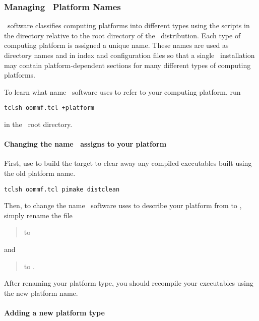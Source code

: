 \subsubsection{Managing \OOMMF\ Platform Names}\label{sec:platformNames}

\OOMMF\ software classifies computing platforms into different types
using the scripts in the directory  relative to the
root directory of the \OOMMF\ distribution.  
Each type of computing platform is assigned a unique name.  
These names are used as directory names
and in index and configuration files so that a single 
\OOMMF\ installation may contain platform-dependent sections for many
different types of computing platforms.

To learn what name \OOMMF\ software uses to refer to your computing
platform, run 
\begin{verbatim}
tclsh oommf.tcl +platform
\end{verbatim}
in the \OOMMF\ root directory.

\paragraph{Changing the name \OOMMF\ assigns to your platform}

First, use 
to build the target  to
clear away any compiled executables built using the old platform
name.
\begin{verbatim}
tclsh oommf.tcl pimake distclean
\end{verbatim}
Then, to change the name \OOMMF\ software uses to describe your platform from 
 to , simply rename the file
\begin{quote}
\hspace{1em} to \hspace{1em}
\end{quote}
and
\begin{quote}
\hspace{1em} to \hspace{1em}
.
\end{quote}
After renaming your platform type, you should recompile your executables
using the new platform name.

\paragraph{Adding a new platform type}

